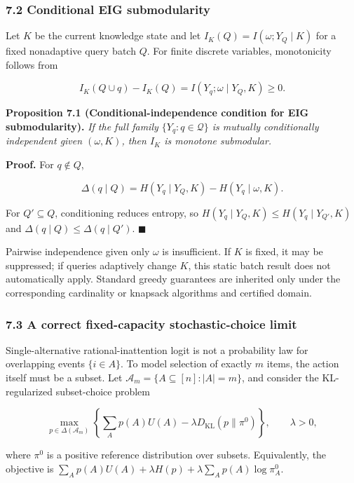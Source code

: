 \documentclass[
  11pt]{article}
\begin{document}
\subsubsection{7.2 Conditional EIG
submodularity}\label{conditional-eig-submodularity}

Let \(K\) be the current knowledge state and let
\(I_K(Q)=I(\omega;Y_Q\mid K)\) for a fixed nonadaptive query batch
\(Q\). For finite discrete variables, monotonicity follows from

\[I_K(Q\cup q)-I_K(Q)=I(Y_q;\omega\mid Y_Q,K)\ge0.\]

\textbf{Proposition 7.1 (Conditional-independence condition for EIG
submodularity).} \emph{If the full family \(\{Y_q:q\in\mathcal Q\}\) is
mutually conditionally independent given \((\omega,K)\), then \(I_K\) is
monotone submodular.}

\textbf{Proof.} For \(q\notin Q\),

\[\Delta(q\mid Q)=H(Y_q\mid Y_Q,K)-H(Y_q\mid\omega,K).\]

For \(Q'\subseteq Q\), conditioning reduces entropy, so
\(H(Y_q\mid Y_Q,K)\le H(Y_q\mid Y_{Q'},K)\) and
\(\Delta(q\mid Q)\le\Delta(q\mid Q')\). \(\blacksquare\)

Pairwise independence given only \(\omega\) is insufficient. If \(K\) is
fixed, it may be suppressed; if queries adaptively change \(K\), this
static batch result does not automatically apply. Standard greedy
guarantees are inherited only under the corresponding cardinality or
knapsack algorithms and certified domain.

\subsubsection{7.3 A correct fixed-capacity stochastic-choice
limit}\label{a-correct-fixed-capacity-stochastic-choice-limit}

Single-alternative rational-inattention logit is not a probability law
for overlapping events \(\{i\in A\}\). To model selection of exactly
\(m\) items, the action itself must be a subset. Let
\(\mathcal A_m=\{A\subseteq[n]:|A|=m\}\), and consider the
KL-regularized subset-choice problem

\[\max_{p\in\Delta(\mathcal A_m)}\left\{\sum_A p(A)U(A)-\lambda D_{\mathrm{KL}}(p\|\pi^0)\right\},\qquad \lambda>0,\]

where \(\pi^0\) is a positive reference distribution over subsets.
Equivalently, the objective is
\(\sum_Ap(A)U(A)+\lambda H(p)+\lambda\sum_Ap(A)\log\pi_A^0\).
\end{document}
